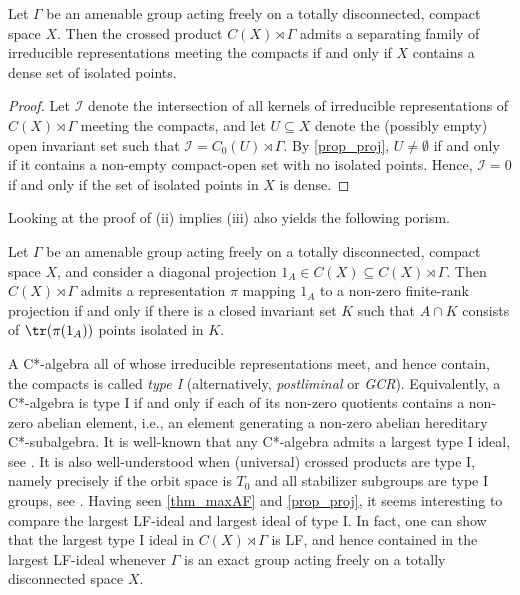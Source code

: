 \documentclass[12pt, a4paper, oneside]{amsart}
\newcommand{\0}{\mathbf{0}}
\newcommand{\1}{\mathbf{1}}
\newcommand{\I}{\mathscr{I}}
\begin{document}
	\begin{corollary}
		\label{cor_iso}
		Let \(\Gamma\) be an amenable group acting freely on a totally disconnected, compact space \(X\). Then the crossed product \(C(X) \rtimes \Gamma\) admits a separating family of irreducible representations meeting the compacts if and only if \(X\) contains a dense set of isolated points. 
	\end{corollary}
	
	\begin{proof}
		Let \(\I\) denote the intersection of all kernels of irreducible representations of \(C(X) \rtimes \Gamma\) meeting the compacts, and let \(U \subseteq X\) denote the (possibly empty) open invariant set such that \(\I = C_0(U) \rtimes \Gamma\). By \cref{prop_proj}, \(U \neq \emptyset\) if and only if it contains a non-empty compact-open set with no isolated points. Hence, \(\I = 0\) if and only if the set of isolated points in \(X\) is dense. 
	\end{proof}
	
	Looking at the proof of (ii) implies (iii) also yields the following porism. 
	
	\begin{corollary}
		Let \(\Gamma\) be an amenable group acting freely on a totally disconnected, compact space \(X\), and consider a diagonal projection \(1_A \in C(X) \subseteq C(X) \rtimes \Gamma\). Then \(C(X) \rtimes \Gamma\) admits a representation \(\pi\) mapping \(1_A\) to a non-zero finite-rank projection if and only if there is a closed invariant set \(K\) such that \(A \cap K\) consists of \(\tr(\pi(1_A))\) points isolated in \(K\). 
	\end{corollary}
	
	A C*-algebra all of whose irreducible representations meet, and hence contain, the compacts is called \textit{type I} (alternatively, \textit{postliminal} or \textit{GCR}). Equivalently, a C*-algebra is type I if and only if each of its non-zero quotients contains a non-zero abelian element, i.e., an element generating a non-zero abelian hereditary C*-subalgebra. It is well-known that any C*-algebra admits a largest type I ideal, see \cite[Proposition 6.2.7]{pedersen_blue}. It is also well-understood when (universal) crossed products are type I, namely precisely if the orbit space is \(T_0\) and all stabilizer subgroups are type I groups, see \cite[Theorem 3.3]{gootman}. Having seen \cref{thm_maxAF} and \cref{prop_proj}, it seems interesting to compare the largest LF-ideal and largest ideal of type I. In fact, one can show that the largest type I ideal in $C(X) \rtimes \Gamma$ is LF, and hence contained in the largest LF-ideal whenever \(\Gamma\) is an exact group acting freely on a totally disconnected space \(X\). 
	
\end{document}
